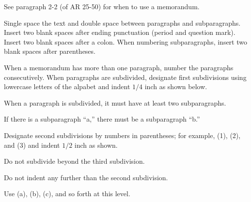 \documentclass{armymemo}
\begin{document}
\AMsethead

\Ni See paragraph 2-2 (of AR 25-50) for when to use a memorandum.

\Ni Single space the text and double space between paragraphs and
subparagraphs. Insert two blank spaces after ending punctuation (period and
question mark). %
Insert two blank spaces after a colon. When numbering subparagraphs, insert two
blank spaces after parentheses.

\Ni When a memorandum has more than one paragraph, number the paragraphs
consecutively. When paragraphs are subdivided, designate first subdivisions
using lowercase letters of the alpabet and indent $1/4$ inch as shown below.

\Nii When a paragraph is subdivided, it must have at least two subparagraphs.

\Nii If there is a subparagraph ``a,'' there must be a subparagraph ``b.''

\Niii Designate second subdivisions by numbers in parentheses; for example, (1),
(2), and (3) and indent $1/2$ inch as shown.

\Niii Do not subdivide beyond the third subdivision.

\Niiii Do not indent any further than the second subdivision.

\Niiii Use (a), (b), (c), and so forth at this level.

\end{document}
